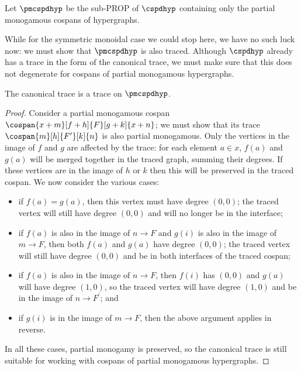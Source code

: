 \begin{definition}
    Let \(\pmcspdhyp\) be the sub-PROP of \(\cspdhyp\) containing only the
    partial monogamous cospans of hypergraphs.
\end{definition}

While for the symmetric monoidal case we could stop here, we have no such luck
now: we must show that \(\pmcspdhyp\) is also traced.
Although \(\cspdhyp\) already has a trace in the form of the canonical trace, we
must make sure that this does not degenerate for cospans of partial monogamous
hypergraphs.

\begin{theorem}\label{thm:partial-monogamous-trace}
    The canonical trace is a trace on \(\pmcspdhyp\).
\end{theorem}
\begin{proof}
    Consider a partial monogamous cospan \(
    \cospan{x + m}[f + h]{F}[g + k]{x + n}
    \); we must show that its trace \(
    \cospan{m}[h]{F^\prime}[k]{n}
    \) is also partial monogamous.
    Only the vertices in the image of \(f\) and \(g\) are affected by the trace:
    for each element \(a \in x\), \(f(a)\) and \(g(a)\) will be merged
    together in the traced graph, summing their degrees.
    If these vertices are in the image of \(h\) or \(k\) then this will be
    preserved in the traced cospan.
    We now consider the various cases:
    \begin{itemize}
        \item if \(f(a) = g(a)\), then this vertex must have degree \((0, 0)\);
              the traced vertex will still have degree \((0, 0)\) and will no
              longer be in the interface;
        \item if \(f(a)\) is also in the image of \(n \to F\) and \(g(i)\) is
              also in the image of \(m \to F\), then both \(f(a)\) and
              \(g(a)\) have degree \((0, 0)\); the traced vertex will still
              have degree \((0, 0)\) and be in both interfaces of the traced
              cospan;
        \item if \(f(a)\) is also in the image of \(n \to F\), then \(f(i)\)
              has \((0, 0)\) and \(g(a)\) will have degree
              \((1,0)\), so the traced vertex will have degree \((1, 0)\) and
              be in the image of \(n \to F^\prime\); and
        \item if \(g(i)\) is in the image of \(m \to F\), then the above
              argument applies in reverse.
    \end{itemize}
    In all these cases, partial monogamy is preserved, so the canonical trace is
    still suitable for working with cospans of partial monogamous hypergraphs.
\end{proof}


